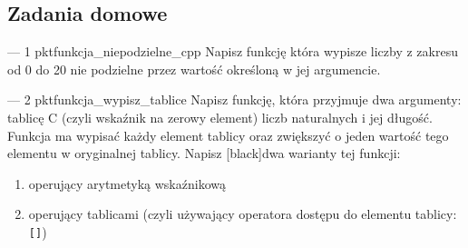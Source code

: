 % 
% 
% 
% 


\subsection{Zadania domowe}
\vspace{3pt}

\begin{Zadanie}{ --- 1 pkt}{funkcja_niepodzielne_cpp}
Napisz funkcję która wypisze liczby z zakresu od 0 do 20 nie podzielne przez wartość określoną w jej argumencie.
\end{Zadanie}

\begin{Zadanie}{ --- 2 pkt}{funkcja_wypisz_tablice}
Napisz funkcję, która przyjmuje dwa argumenty: tablicę C (czyli wskaźnik na zerowy element) liczb naturalnych i jej długość.
Funkcja ma wypisać każdy element tablicy oraz zwiększyć o jeden wartość tego elementu w oryginalnej tablicy.
Napisz \ul[black]{dwa warianty} tej funkcji:
\begin{enumerate}[label=\alph*)]
\item operujący arytmetyką wskaźnikową
\item operujący tablicami (czyli używający operatora dostępu do elementu tablicy: \Verb#[]#)
\end{enumerate}
\end{Zadanie}

